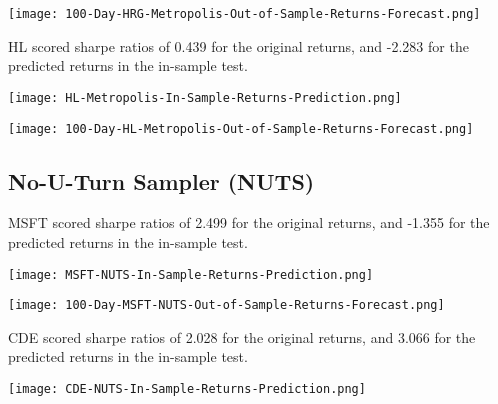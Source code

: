 \begin{center}  
    \texttt{[image: 100-Day-HRG-Metropolis-Out-of-Sample-Returns-Forecast.png]}
    \label{fig:nonfloat}
\end{center}

HL scored sharpe ratios of 0.439 for the original returns, and -2.283 for the predicted returns in the in-sample test.

\begin{center}
    \texttt{[image: HL-Metropolis-In-Sample-Returns-Prediction.png]}
    \label{fig:nonfloat}
\end{center}

\begin{center}  
    \texttt{[image: 100-Day-HL-Metropolis-Out-of-Sample-Returns-Forecast.png]}
    \label{fig:nonfloat}
\end{center}

\subsection{No-U-Turn Sampler (NUTS)}
MSFT scored sharpe ratios of 2.499 for the original returns, and -1.355 for the predicted returns in the in-sample test.

\begin{center}
    \texttt{[image: MSFT-NUTS-In-Sample-Returns-Prediction.png]}
    \label{fig:nonfloat}
\end{center}

\begin{center}  
    \texttt{[image: 100-Day-MSFT-NUTS-Out-of-Sample-Returns-Forecast.png]}
    \label{fig:nonfloat}
\end{center}

CDE scored sharpe ratios of 2.028 for the original returns, and 3.066 for the predicted returns in the in-sample test.

\begin{center}
    \texttt{[image: CDE-NUTS-In-Sample-Returns-Prediction.png]}
    \label{fig:nonfloat}
\end{center}

